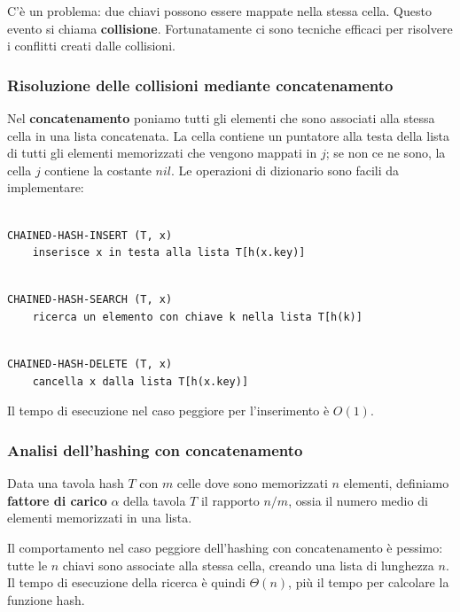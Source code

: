 C'è un problema: due chiavi possono essere mappate nella stessa cella. Questo evento si chiama \textbf{collisione}. Fortunatamente ci sono tecniche efficaci per risolvere i conflitti creati dalle collisioni.

\subsubsection{Risoluzione delle collisioni mediante concatenamento}

Nel \textbf{concatenamento} poniamo tutti gli elementi che sono associati alla stessa cella in una lista concatenata. La cella contiene un puntatore alla testa della lista di tutti gli elementi memorizzati che vengono mappati in $j$; se non ce ne sono, la cella $j$ contiene la costante $nil$. Le operazioni di dizionario sono facili da implementare:

\begin{lstlisting}

CHAINED-HASH-INSERT (T, x)
	inserisce x in testa alla lista T[h(x.key)]

\end{lstlisting}

\begin{lstlisting}

CHAINED-HASH-SEARCH (T, x)
	ricerca un elemento con chiave k nella lista T[h(k)]

\end{lstlisting}

\begin{lstlisting}

CHAINED-HASH-DELETE (T, x)
	cancella x dalla lista T[h(x.key)]

\end{lstlisting}

Il tempo di esecuzione nel caso peggiore per l'inserimento è $O(1)$.

\subsubsection{Analisi dell'hashing con concatenamento}

Data una tavola hash $T$ con $m$ celle dove sono memorizzati $n$ elementi, definiamo \textbf{fattore di carico} $\alpha$ della tavola $T$ il rapporto $n/m$, ossia il numero medio di elementi memorizzati in una lista.

Il comportamento nel caso peggiore dell'hashing con concatenamento è pessimo: tutte le $n$ chiavi sono associate alla stessa cella, creando una lista di lunghezza $n$. Il tempo di esecuzione della ricerca è quindi $\Theta(n)$, più il tempo per calcolare la funzione hash.

